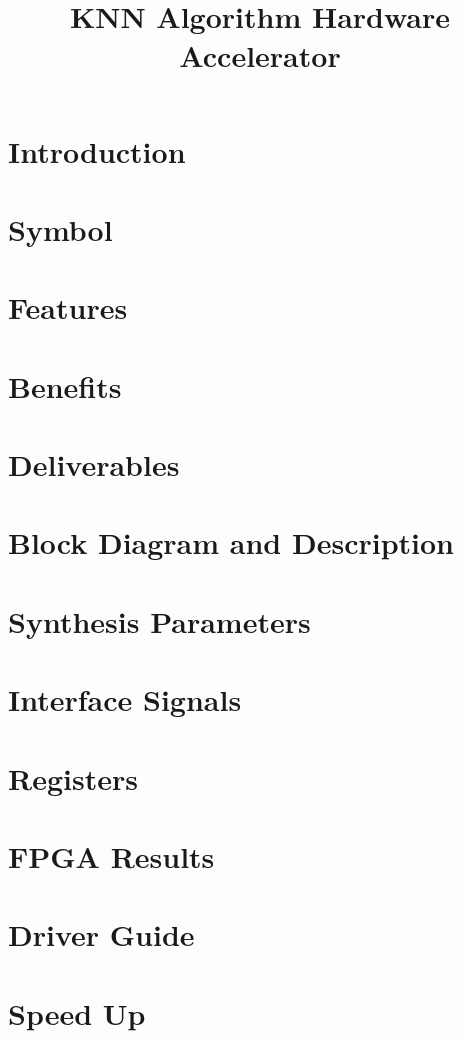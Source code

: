 \documentclass{../../submodules/TEX/document/ug/ug}
\title{KNN Algorithm Hardware Accelerator}
\begin{document}
\maketitle
\cleardoublepage
\tableofcontents
\listoftables
\listoffigures
\cleardoublepage

\section{Introduction}


\section{Symbol}


\section{\textcolor[rgb]{0,0,0}{Features}}

\clearpage

\section{\textcolor[rgb]{0,0,0}{Benefits}}


\section{\textcolor[rgb]{0,0,0}{Deliverables}}

\clearpage

\section{\textcolor[rgb]{0,0,0}{Block Diagram and Description}}

\clearpage

\section{\textcolor[rgb]{0,0,0}{Synthesis Parameters}}


\section{Interface Signals}


\section{Registers}


\section{\textcolor[rgb]{0,0,0}{FPGA Results}}


\section{Driver Guide}


\section{Speed Up}

%
%
\end{document}
